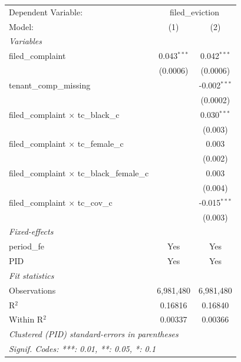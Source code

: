 \begingroup
\centering
\begin{tabular}{lcc}
   \tabularnewline \midrule \midrule
   Dependent Variable: & \multicolumn{2}{c}{filed\_eviction}\\
   Model:                                              & (1)           & (2)\\  
   \midrule
   \emph{Variables}\\
   filed\_complaint                                    & 0.043$^{***}$ & 0.042$^{***}$\\   
                                                       & (0.0006)      & (0.0006)\\   
   tenant\_comp\_missing                               &               & -0.002$^{***}$\\   
                                                       &               & (0.0002)\\   
   filed\_complaint $\times$ tc\_black\_c              &               & 0.030$^{***}$\\   
                                                       &               & (0.003)\\   
   filed\_complaint $\times$ tc\_female\_c             &               & 0.003\\   
                                                       &               & (0.002)\\   
   filed\_complaint $\times$ tc\_black\_female\_c      &               & 0.003\\   
                                                       &               & (0.004)\\   
   filed\_complaint $\times$ tc\_cov\_c                &               & -0.015$^{***}$\\   
                                                       &               & (0.003)\\   
   \midrule
   \emph{Fixed-effects}\\
   period\_fe                                          & Yes           & Yes\\  
   PID                                                 & Yes           & Yes\\  
   \midrule
   \emph{Fit statistics}\\
   Observations                                        & 6,981,480     & 6,981,480\\  
   R$^2$                                               & 0.16816       & 0.16840\\  
   Within R$^2$                                        & 0.00337       & 0.00366\\  
   \midrule \midrule
   \multicolumn{3}{l}{\emph{Clustered (PID) standard-errors in parentheses}}\\
   \multicolumn{3}{l}{\emph{Signif. Codes: ***: 0.01, **: 0.05, *: 0.1}}\\
\end{tabular}
